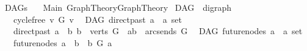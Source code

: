 %
\begin{isabellebody}%
%
%
\isadelimtheory
\isanewline
\isanewline
\isanewline
%
\endisadelimtheory
%
\isatagtheory
{}\isamarkupfalse%
\ DAGs\isanewline
\ \ \ Main\ Graph{\isacharunderscore}{\kern0pt}Theory{\isachardot}{\kern0pt}Graph{\isacharunderscore}{\kern0pt}Theory\isanewline
{}%
\endisatagtheory
{\isafoldtheory}%
%
\isadelimtheory
%
\endisadelimtheory
%
\isadelimdocument
%
\endisadelimdocument
%
\isatagdocument
%
\isamarkuptrue%
%
\endisatagdocument
{\isafolddocument}%
%
\isadelimdocument
%
\endisadelimdocument
{}\isamarkupfalse%
\ DAG\ {\isacharequal}{\kern0pt}\ digraph\ {\isacharplus}{\kern0pt}\isanewline
\ \ \ cycle{\isacharunderscore}{\kern0pt}free{\isacharcolon}{\kern0pt}\ {\isachardoublequoteopen}{\isasymnot}{\isacharparenleft}{\kern0pt}v\ {\isasymrightarrow}\isactrlsup {\isacharplus}{\kern0pt}\isactrlbsub G\isactrlesub \ v{\isacharparenright}{\kern0pt}{\isachardoublequoteclose}%
\isadelimdocument
%
\endisadelimdocument
%
\isatagdocument
%
\isamarkuptrue%
%
\endisatagdocument
{\isafolddocument}%
%
\isadelimdocument
%
\endisadelimdocument
{}\isamarkupfalse%
\ {\isacharparenleft}{\kern0pt}\ DAG{\isacharparenright}{\kern0pt}\ direct{\isacharunderscore}{\kern0pt}past{\isacharcolon}{\kern0pt}{\isacharcolon}{\kern0pt}\ {\isachardoublequoteopen}{\isacharprime}{\kern0pt}a\ {\isasymRightarrow}\ {\isacharprime}{\kern0pt}a\ set{\isachardoublequoteclose}\isanewline
\ \ \ {\isachardoublequoteopen}direct{\isacharunderscore}{\kern0pt}past\ a\ {\isacharequal}{\kern0pt}\ {\isacharbraceleft}{\kern0pt}b{\isachardot}{\kern0pt}\ {\isacharparenleft}{\kern0pt}b\ {\isasymin}\ verts\ G\ {\isasymand}\ {\isacharparenleft}{\kern0pt}a{\isacharcomma}{\kern0pt}b{\isacharparenright}{\kern0pt}\ {\isasymin}\ arcs{\isacharunderscore}{\kern0pt}ends\ G{\isacharparenright}{\kern0pt}{\isacharbraceright}{\kern0pt}{\isachardoublequoteclose}\isanewline
\isanewline
{}\isamarkupfalse%
\ {\isacharparenleft}{\kern0pt}\ DAG{\isacharparenright}{\kern0pt}\ future{\isacharunderscore}{\kern0pt}nodes{\isacharcolon}{\kern0pt}{\isacharcolon}{\kern0pt}\ {\isachardoublequoteopen}{\isacharprime}{\kern0pt}a\ {\isasymRightarrow}\ {\isacharprime}{\kern0pt}a\ set{\isachardoublequoteclose}\isanewline
\ \ \ {\isachardoublequoteopen}future{\isacharunderscore}{\kern0pt}nodes\ a\ {\isacharequal}{\kern0pt}\ {\isacharbraceleft}{\kern0pt}b{\isachardot}{\kern0pt}\ \ b\ {\isasymrightarrow}\isactrlsup {\isacharplus}{\kern0pt}\isactrlbsub G\isactrlesub \ a{\isacharbraceright}{\kern0pt}{\isachardoublequoteclose}\isanewline

\end{isabellebody}
